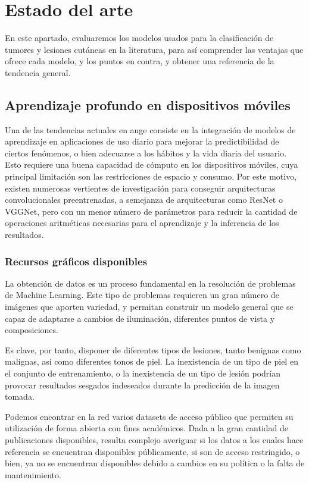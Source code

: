 \chapter{Estado del arte}

En este apartado, evaluaremos los modelos usados para la clasificación de tumores y lesiones cutáneas en la literatura, para así comprender las ventajas que ofrece cada modelo, y los puntos en contra, y obtener una referencia de la tendencia general.

\section{Aprendizaje profundo en dispositivos móviles}

Una de las tendencias actuales en auge consiste en la integración de modelos de aprendizaje en aplicaciones de uso diario para mejorar la predictibilidad de ciertos fenómenos, o bien adecuarse a los hábitos y la vida diaria del usuario. Esto requiere una buena capacidad de cómputo en los dispositivos móviles, cuya principal limitación son las restricciones de espacio y consumo. Por este motivo, existen numerosas vertientes de investigación para conseguir arquitecturas convolucionales preentrenadas, a semejanza de arquitecturas como ResNet o VGGNet, pero con un menor número de parámetros para reducir la cantidad de operaciones aritméticas necesarias para el aprendizaje y la inferencia de los resultados.\\

\subsection{Recursos gráficos disponibles}

La obtención de datos es un proceso fundamental en la resolución de problemas de Machine Learning. Este tipo de problemas requieren un gran número de imágenes que aporten variedad, y permitan construir un modelo general que se capaz de adaptarse a cambios de iluminación, diferentes puntos de vista y composiciones.

Es clave, por tanto, disponer de diferentes tipos de lesiones, tanto benignas como malignas, así como diferentes tonos de piel. La inexistencia de un tipo de piel en el conjunto de entrenamiento, o la inexistencia de un tipo de lesión podrían provocar resultados sesgados indeseados durante la predicción de la imagen tomada.

Podemos encontrar en la red varios datasets de acceso público que permiten su utilización de forma abierta con fines académicos. Dada a la gran cantidad de publicaciones disponibles, resulta complejo averiguar si los datos a los cuales hace referencia se encuentran disponibles públicamente, si son de acceso restringido, o bien, ya no se encuentran disponibles debido a cambios en su política o la falta de mantenimiento.

